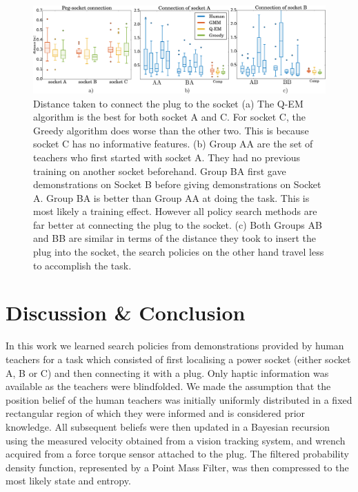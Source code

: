 \documentclass[final,5p,times,twocolumn]{elsarticle}
\begin{document}
\begin{figure}
 \centering
   \includegraphics[width=\linewidth]{./Figure/real_socket_human_all.pdf}
  \caption{ Distance taken to connect the plug to the socket (a) The Q-EM algorithm is the best for both socket A and C. 
  For socket C, the Greedy algorithm does worse than the other two. This is because socket C has no informative features. 
  (b) Group AA are the set of teachers who first started with socket A. They had no previous training on another socket beforehand. Group 
  BA first gave demonstrations on Socket B before giving demonstrations on Socket A. Group BA
  is better than Group AA at doing the task. This is most likely a training effect. However all policy search methods are far better
  at connecting the plug to the socket. (c) Both Groups AB and BB are similar in terms   of the distance they took to 
  insert the plug into the socket, the search policies on the other hand travel less to accomplish the task.   } 
  \label{fig:real_statistics}
\end{figure}


\section{Discussion \& Conclusion}\label{sec:conclusion}

In this work we learned search policies from demonstrations provided by human teachers for a task
which consisted of first localising a power socket (either socket A, B or C) and then connecting it with a plug. Only haptic information 
was available as the teachers were blindfolded. We made the assumption that the position belief of the human teachers 
was initially uniformly distributed in a fixed rectangular region of which they were 
informed and is considered prior knowledge. All subsequent beliefs were then updated in a Bayesian recursion 
using the measured velocity obtained from a vision tracking system, and wrench acquired from a force torque sensor attached 
to the plug. The filtered probability density function, represented by a Point Mass Filter, was then compressed to the 
most likely state and entropy.
\end{document}
